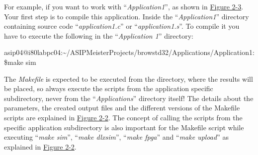 \documentclass[
]{article}
\begin{document}
For example, if you want to work with ``\emph{Application1}'', as shown
in \protect\hyperlink{Fig23}{Figure 2-3}. Your first step is to compile
this application. Inside the ``\emph{Application1}'' directory
containing source code ``\emph{application1.c}'' or
``\emph{application1.s}''. To compile it you have to execute the
following in the ``\emph{Application 1}'' directory:

asip04@i80labpc04:\textasciitilde/ASIPMeisterProjects/browstd32/Applications/Application1:\$make
sim

The \emph{Makefile} is expected to be executed from the directory, where
the results will be placed, so always execute the scripts from the
application specific subdirectory, never from the
``\emph{Applications}'' directory itself! The details about the
parameters, the created output files and the different versions of the
Makefile scripts are explained in \protect\hyperlink{Fig22}{Figure 2-2}.
The concept of calling the scripts from the specific application
subdirectory is also important for the Makefile script while executing
``\emph{make sim}'', ``\emph{make dlxsim}'', ``\emph{make fpga}'' and
``\emph{make upload}'' as explained in \protect\hyperlink{Fig22}{Figure
2-2}.
\end{document}
